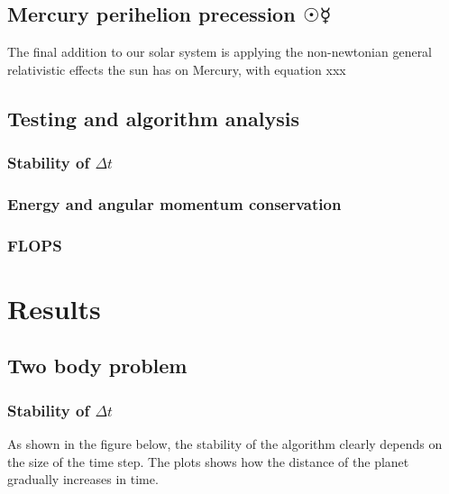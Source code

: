 \documentclass[10pt]{article}
\begin{document}
\begin{multicols}{2}
\subsection{Mercury perihelion precession \texorpdfstring{$\Sun\Mercury$}{}} 
The final addition to our solar system is applying the non-newtonian general relativistic effects the sun has on Mercury, with equation xxx

\subsection{Testing and algorithm analysis}
\subsubsection{Stability of \texorpdfstring{$\Delta t$}{}}
\subsubsection{Energy and angular momentum conservation}
\subsubsection{FLOPS}

\section{Results}
\subsection{Two body problem}
\subsubsection{Stability of $\Delta t$}
As shown in the figure below, the stability of the algorithm clearly depends on the size of the time step. The plots shows how the distance of the planet gradually increases in time.  


\end{multicols}
\end{document}
